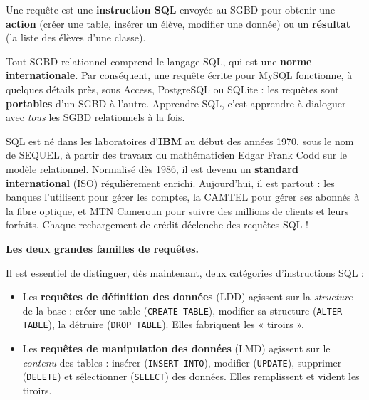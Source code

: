 \documentclass[11pt]{article}
\newcommand{\cle}[1]{{\popxbold\color{popdark}#1}}
\begin{document}
\begin{definition}[Requête]
Une \cle{requête} est une \textbf{instruction SQL} envoyée au SGBD pour obtenir une \textbf{action} (créer une table, insérer un élève, modifier une donnée) ou un \textbf{résultat} (la liste des élèves d'une classe).
\end{definition}

\begin{propriete}
Tout SGBD relationnel comprend le langage SQL, qui est une \textbf{norme internationale}. Par conséquent, une requête écrite pour MySQL fonctionne, à quelques détails près, sous Access, PostgreSQL ou SQLite : les requêtes sont \textbf{portables} d'un SGBD à l'autre. Apprendre SQL, c'est apprendre à dialoguer avec \emph{tous} les SGBD relationnels à la fois.
\end{propriete}

\begin{savaistu}
SQL est né dans les laboratoires d'\textbf{IBM} au début des années 1970, sous le nom de SEQUEL, à partir des travaux du mathématicien Edgar Frank Codd sur le modèle relationnel. Normalisé dès 1986, il est devenu un \textbf{standard international} (ISO) régulièrement enrichi. Aujourd'hui, il est partout : les banques l'utilisent pour gérer les comptes, la CAMTEL pour gérer ses abonnés à la fibre optique, et MTN Cameroun pour suivre des millions de clients et leurs forfaits. Chaque rechargement de crédit déclenche des requêtes SQL !
\end{savaistu}

\textbf{Les deux grandes familles de requêtes.}\par
Il est essentiel de distinguer, dès maintenant, deux catégories d'instructions SQL :

\begin{itemize}
\item Les \textbf{requêtes de définition des données} (LDD) agissent sur la \emph{structure} de la base : créer une table (\texttt{CREATE TABLE}), modifier sa structure (\texttt{ALTER TABLE}), la détruire (\texttt{DROP TABLE}). Elles fabriquent les « tiroirs ».
\item Les \textbf{requêtes de manipulation des données} (LMD) agissent sur le \emph{contenu} des tables : insérer (\texttt{INSERT INTO}), modifier (\texttt{UPDATE}), supprimer (\texttt{DELETE}) et sélectionner (\texttt{SELECT}) des données. Elles remplissent et vident les tiroirs.
\end{itemize}
\end{document}

